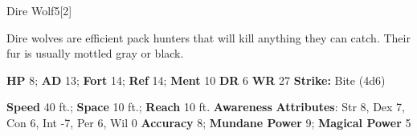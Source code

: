   \begin{monsection}{Dire Wolf}{5}[2]
    \vspace{-1em}\vspace{-1em}
    \vspace{0em}

    
      Dire wolves are efficient pack hunters that will kill anything they can catch.
      Their fur is usually mottled gray or black.
    

    \begin{spellcontent}
      \begin{spelltargetinginfo}
        \pari \textbf{HP} 8;
          \textbf{AD} 13;
          \textbf{Fort} 14;
          \textbf{Ref} 14;
          \textbf{Ment} 10
        \pari \textbf{DR} 6
        \pari \textbf{WR} 27
        \pari \textbf{Strike:}
            Bite  (4d6)
      \end{spelltargetinginfo}
    \end{spellcontent}
    \begin{monsterfooter}
      \pari \textbf{Speed} 40 ft.;
        \textbf{Space} 10 ft.;
        \textbf{Reach} 10 ft.
      \pari \textbf{Awareness} 
      \pari \textbf{Attributes}:
        Str 8, Dex 7,
        Con 6, Int -7,
        Per 6, Wil 0
      \pari \textbf{Accuracy} 8;
        \textbf{Mundane Power} 9;
      \textbf{Magical Power} 5
    \end{monsterfooter}
  \end{monsection}
  
